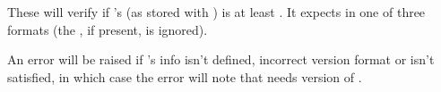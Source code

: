 \documentclass[10pt]{article}
\begin{document}
\begin{codedescribe}{\PkgRequired}
\begin{codesyntax}%
\end{codesyntax}
These will verify if 's  (as stored with \tsobj{\PkgSet}) is at least . It expects  in one of three formats  (the \tsobj[key]{[v]}, if present, is ignored).
\end{codedescribe}
\begin{tsremark}
  An error will be raised if 's info isn't defined, incorrect version format or  isn't satisfied, in which case the error will note that  needs version  of .
\end{tsremark}



\end{document}
